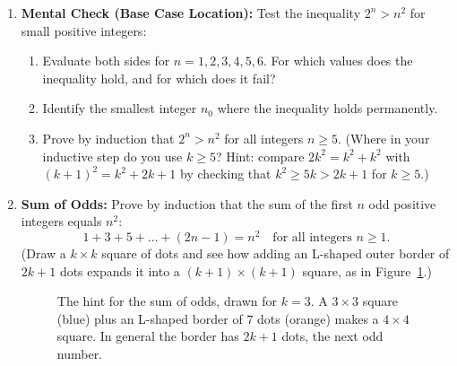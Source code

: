 \begin{enumerate}
\item \textbf{Mental Check (Base Case Location):} Test the inequality $2^n > n^2$ for small positive integers:
\begin{enumerate}[label=(\alph*)]
\item Evaluate both sides for $n = 1, 2, 3, 4, 5, 6$. For which values does the inequality hold, and for which does it fail?
\item Identify the smallest integer $n_0$ where the inequality holds permanently.
\item Prove by induction that $2^n > n^2$ for all integers $n \ge 5$. (Where in your inductive step do you use $k \ge 5$? Hint: compare $2k^2 = k^2 + k^2$ with $(k+1)^2 = k^2 + 2k + 1$ by checking that $k^2 \ge 5k > 2k + 1$ for $k \ge 5$.)
\end{enumerate}

\item \textbf{Sum of Odds:} Prove by induction that the sum of the first $n$ odd positive integers equals $n^2$:
\[
1 + 3 + 5 + \dots + (2n - 1) = n^2 \quad \text{for all integers } n \ge 1.
\]
(Draw a $k \times k$ square of dots and see how adding an L-shaped outer border of $2k + 1$ dots expands it into a $(k+1) \times (k+1)$ square, as in Figure~\ref{17:fig-odd-squares}.)

\begin{figure}[htbp]
\centering
{}
\caption{The hint for the sum of odds, drawn for $k = 3$. A $3 \times 3$ square (blue) plus an L-shaped border of $7$ dots (orange) makes a $4 \times 4$ square. In general the border has $2k + 1$ dots, the next odd number.}
\label{17:fig-odd-squares}
\end{figure}


\end{enumerate}
